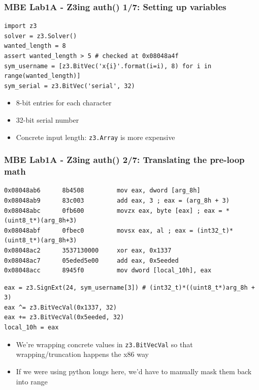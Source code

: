 \documentclass[aspectratio=169]{beamer}
\begin{document}
\begin{frame}[fragile]
\frametitle{MBE Lab1A - Z3ing auth() 1/7: Setting up variables}
\begin{Verbatim}[fontsize=\scriptsize, frame=single]
import z3
solver = z3.Solver()
wanted_length = 8
assert wanted_length > 5 # checked at 0x08048a4f
sym_username = [z3.BitVec('x{i}'.format(i=i), 8) for i in range(wanted_length)]
sym_serial = z3.BitVec('serial', 32)
\end{Verbatim}
\begin{itemize}
\item 8-bit entries for each character
\item 32-bit serial number
\item Concrete input length: \verb|z3.Array| is more expensive
\end{itemize}
\end{frame}

\begin{frame}[fragile]
\frametitle{MBE Lab1A - Z3ing auth() 2/7: Translating the pre-loop math}
\begin{Verbatim}[fontsize=\scriptsize, frame=single]
0x08048ab6      8b4508         mov eax, dword [arg_8h]
0x08048ab9      83c003         add eax, 3 ; eax = (arg_8h + 3)
0x08048abc      0fb600         movzx eax, byte [eax] ; eax = *(uint8_t*)(arg_8h+3)
0x08048abf      0fbec0         movsx eax, al ; eax = (int32_t)*(uint8_t*)(arg_8h+3)
0x08048ac2      3537130000     xor eax, 0x1337
0x08048ac7      05eded5e00     add eax, 0x5eeded
0x08048acc      8945f0         mov dword [local_10h], eax
\end{Verbatim}

\begin{Verbatim}[fontsize=\scriptsize, frame=single]
eax = z3.SignExt(24, sym_username[3]) # (int32_t)*((uint8_t*)arg_8h + 3)
eax ^= z3.BitVecVal(0x1337, 32)
eax += z3.BitVecVal(0x5eeded, 32)
local_10h = eax
\end{Verbatim}
\begin{itemize}
\item We're wrapping concrete values in \verb|z3.BitVecVal| so that wrapping/truncation happens the x86 way
\item If we were using python longs here, we'd have to manually mask them back into range
\end{itemize}
\end{frame}
\end{document}
